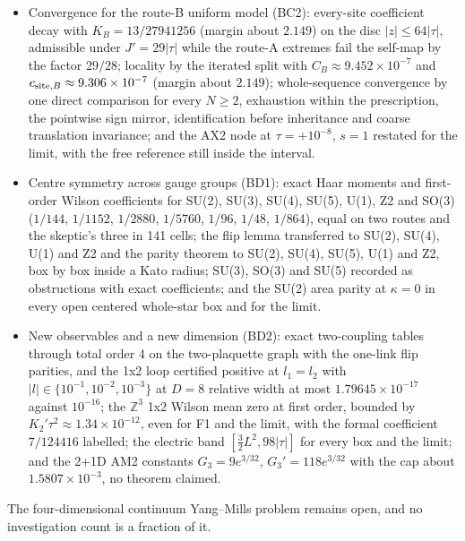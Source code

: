 \documentclass[11pt,a4paper]{article}
\begin{document}
\begin{itemize}
 $[6.91090\times10^{-11},6.97799\times10^{-11}]$, both restated for the limit
 of the named constructions with unchanged constants; the sign of the static
 Wilson mean of the untruncated padded boxes certified for every $N\ge4$ at
 $\tau=\pm10^{-8}$ only, with the boxes $N=2,3$ open and no finite-box node; and a
 reviewed obligations table of 21 rows, in which O1 is split into O1a, closed
 within the BB2 scope, and O1b, open.
\item Convergence for the route-B uniform model (BC2): every-site
 coefficient decay with $K_B=13/27941256$ (margin about $2.149$) on the disc
 $|z|\le64|\tau|$, admissible under $J'=29|\tau|$ while the route-A extremes
 fail the self-map by the factor $29/28$; locality by the iterated split with
 $C_B\approx9.452\times10^{-7}$ and $c_{{\rm site},B}\approx9.306\times10^{-7}$
 (margin about $2.149$); whole-sequence convergence by one direct comparison
 for every $N\ge2$, exhaustion within the prescription, the pointwise sign
 mirror, identification before inheritance and coarse translation
 invariance; and the AX2 node at $\tau=+10^{-8}$, $s=1$ restated for the
 limit, with the free reference still inside the interval.
\item Centre symmetry across gauge groups (BD1): exact Haar moments and
 first-order Wilson coefficients for SU(2), SU(3), SU(4), SU(5), U(1), Z2 and
 SO(3) ($1/144$, $1/1152$, $1/2880$, $1/5760$, $1/96$, $1/48$, $1/864$), equal
 on two routes and the skeptic's three in 141 cells; the flip lemma
 transferred to SU(2), SU(4), U(1) and Z2 and the parity theorem to SU(2),
 SU(4), SU(5), U(1) and Z2, box by box inside a Kato radius; SU(3), SO(3) and
 SU(5) recorded as obstructions with exact coefficients; and the SU(2) area
 parity at $\kappa=0$ in every open centered whole-star box and for the
 limit.
\item New observables and a new dimension (BD2): exact two-coupling tables
 through total order 4 on the two-plaquette graph with the one-link flip
 parities, and the 1x2 loop certified positive at $l_1=l_2$ with
 $|l|\in\{10^{-1},10^{-2},10^{-3}\}$ at $D=8$ relative width at most
 $1.79645\times10^{-17}$ against
 $10^{-16}$; the $\mathbb Z^3$ 1x2 Wilson mean zero at first order, bounded
 by $K_2'\tau^2\approx1.34\times10^{-12}$, even for F1 and the limit, with the
 formal coefficient $7/124416$ labelled; the electric band $[\tfrac32L^2,98|\tau|]$
 for every box and the limit; and the 2+1D AM2 constants
 $G_3=9e^{3/32}$, $G_3'=118e^{3/32}$ with the cap about
 $1.5807\times10^{-3}$, no theorem claimed.
\end{itemize}
The four-dimensional continuum Yang--Mills problem remains open, and no
investigation count is a fraction of it.
\end{document}
